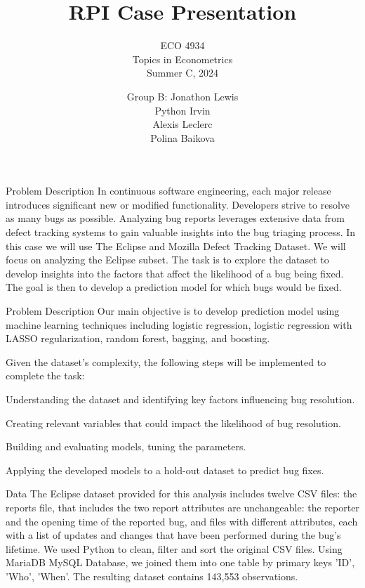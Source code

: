 \documentclass[10pt]{beamer}
\title{RPI Case Presentation}
\subtitle{ECO 4934 \\ Topics in Econometrics \\ Summer C, 2024}
\author{Group B: Jonathon Lewis \\ Python Irvin \\ Alexis Leclerc \\ Polina Baikova}
\begin{document}
	
\begin{frame}
\titlepage
\end{frame}
	
	
\begin{frame}[t]{Problem Description}\justifying \vspace{20pt}
	In continuous software engineering, each major release introduces significant new or modified functionality. Developers strive to resolve as many bugs as possible. Analyzing bug reports leverages extensive data from defect tracking systems to gain valuable insights into the bug triaging process.
	\vskip 16pt
	In this case we will use The Eclipse and Mozilla Defect Tracking Dataset. We will focus on analyzing the Eclipse subset. The task is to explore the dataset to develop insights into the factors that affect the likelihood of a bug being fixed. The goal is then to develop a prediction model for which bugs would be fixed.
	
\end{frame}


\begin{frame}[t]{Problem Description}\justifying \vspace{2pt}
	Our main objective is to develop prediction model using machine learning techniques including logistic regression, logistic regression with LASSO regularization, random forest, bagging, and boosting.  
	
	Given the dataset’s complexity, the following steps will be implemented to complete the task: 
	\begin{description}[font=$\bullet$~\normalfont\scshape\color{red!50!black}]
		\item [Exploratory Data Analysis:] Understanding the dataset and identifying key factors influencing bug resolution.
		\item [Feature Engineering:] Creating relevant variables that could impact the likelihood of bug resolution.
		\item [Model Development:] Building and evaluating models, tuning the parameters. 
		\item [Model Predictions:] Applying the developed models to a hold-out dataset to predict bug fixes.
		
	\end{description}
\end{frame}


\begin{frame}[t]{Data}\justifying \vspace{20pt}
	The Eclipse dataset provided for this analysis includes twelve CSV files: the reports file, that includes the two report attributes are unchangeable: the reporter and the opening time of the reported bug, and files with different attributes, each with a list of updates and changes that have been performed during the bug's lifetime.
	\vskip 16pt  
	We used Python to clean, filter and sort the original CSV files. Using MariaDB MySQL Database, we joined them into one table by primary keys 'ID', 'Who', 'When'.  The resulting dataset contains 143,553 observations.  
\end{frame}
\end{document}
